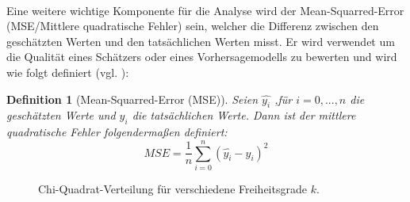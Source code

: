 \documentclass[%
thesis=student,%
coverpage=false,%
titlepage=false,%
headmarks=true, %
german,%
font=libertine, %
math=newpxtx, %
BCOR=5mm,%
coverBCOR=11mm%
]{tumbook}
\theoremstyle{break}
\newtheorem{definition}{Definition}[section]
\begin{document}
\\
Eine weitere wichtige Komponente für die Analyse wird der Mean-Squarred-Error (MSE/Mittlere quadratische Fehler) sein, welcher die Differenz zwischen den geschätzten Werten und den tatsächlichen Werten misst. Er wird verwendet um die Qualität eines Schätzers oder eines Vorhersagemodells zu bewerten und wird wie folgt definiert (vgl. \cite{MSE}):
\begin{definition}[Mean-Squarred-Error (MSE)]
	Seien $\hat{y_i}$ ,für  $i=0,...,n$ die geschätzten Werte und $y_i$ die tatsächlichen Werte. Dann ist der mittlere quadratische Fehler folgendermaßen definiert:
	$$ MSE = \frac{1}{n} \sum_{i = 0}^{n} (\hat{y_i}-y_i)^2$$
\end{definition}
\begin{figure}[h!]
	\centering
	\caption{Chi-Quadrat-Verteilung für verschiedene Freiheitsgrade $k$.}
	\label{fig:chi2}
\end{figure}



\end{document}
